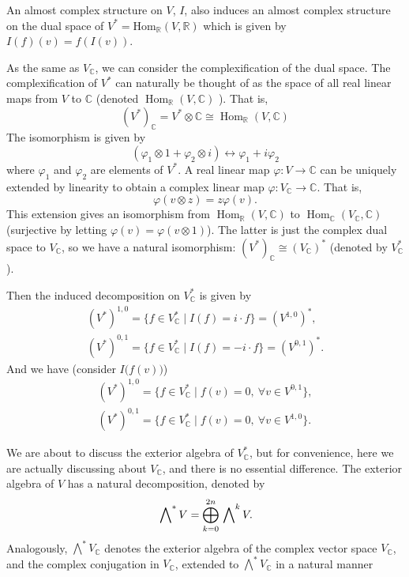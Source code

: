 \documentclass{ctexart}
\begin{document}
An almost complex structure on $V$, $I$, also induces an almost complex structure on the dual space of $V^*=\text{Hom}_\mathbb{R}(V,\mathbb{R})$ which is given by $I(f)(v)=f(I(v))$.

As the same as $V_\mathbb{C}$, we can consider the complexification of the dual space. The complexification of $V^{*}$ can naturally be thought of as the space of all real linear maps 
from $V$ to $\mathbb{C}$ (denoted $\operatorname{Hom}_{\mathbb{R}}(V, \mathbb{C})$ ). That is,
$$
\left(V^{*}\right)_{\mathbb{C}}=V^{*} \otimes \mathbb{C} \cong \operatorname{Hom}_{\mathbb{R}}(V, \mathbb{C})
$$
The isomorphism is given by
$$
\left(\varphi_{1} \otimes 1+\varphi_{2} \otimes i\right) \leftrightarrow \varphi_{1}+i \varphi_{2}
$$
where $\varphi_{1}$ and $\varphi_{2}$ are elements of $V^{*}$. A real linear map $\varphi: V \rightarrow \mathbb{C}$ can be uniquely extended by linearity to obtain a complex linear map 
$\varphi: V_{\mathbb{C}} \rightarrow \mathbb{C}$. That is, 
$$
\varphi(v \otimes z)=z \varphi(v).
$$
This extension gives an isomorphism from $\operatorname{Hom}_{\mathbb{R}}(V, \mathbb{C})$ 
to $\operatorname{Hom}_{\mathbb{C}}(V_{\mathbb{C}}, \mathbb{C})$ (surjective by letting $\varphi(v)=\varphi(v\otimes 1)$). The latter is just the complex dual space 
to $V_{\mathbb{C}}$, so we have a natural isomorphism: $\left(V^{*}\right)_{\mathbb{C}} \cong\left(V_{\mathbb{C}}\right)^{*}$ (denoted by $V_\mathbb{C}^*$). 

Then the induced decomposition on $V_\mathbb{C}^*$ is given by
\begin{align*}
  (V^*)^{1,0}=\{f\in V_\mathbb{C}^* \mid I(f)=i\cdot f\}=(V^{1,0})^*, \\
  (V^*)^{0,1}=\{f\in V_\mathbb{C}^* \mid I(f)=-i\cdot f\}=(V^{0,1})^*. 
\end{align*}
And we have (consider $I\big(f(v)\big)$) 
\begin{equation}
  \begin{aligned}
    (V^*)^{1,0}=\{f\in V_\mathbb{C}^* \mid f(v)=0,\ \forall v\in V^{0,1}\}, \\
    (V^*)^{0,1}=\{f\in V_\mathbb{C}^* \mid f(v)=0,\ \forall v\in V^{1,0}\}. 
  \end{aligned}
\end{equation}

We are about to discuss the exterior algebra of $V_\mathbb{C}^*$, but for convenience, here we are actually discussing about $V_\mathbb{C}$, and there is no essential difference. 
The exterior algebra of $V$ has a natural decomposition, denoted by
$$
\sideset{}{^*}\bigwedge V=\bigoplus_{k=0}^{2n}\sideset{}{^k}\bigwedge V.
$$
Analogously, $\bigwedge^* V_\mathbb{C}$ denotes the exterior algebra of the complex vector space $V_\mathbb{C}$, and the complex conjugation in $V_{\mathbb{C}}$, extended to $\bigwedge^* V_\mathbb{C}$ in a natural manner
\end{document}
